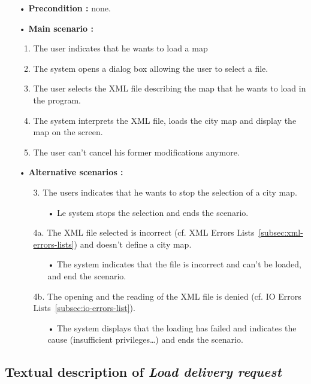 \documentclass[paper=a4, fontsize=11pt]{report}
\numberwithin{equation}{section}		%
\numberwithin{figure}{section}		%
\numberwithin{table}{section}		%
\renewcommand{\it}[1]{\textit{#1}}
\begin{document}
\begin{itemize}
  \item[•] \textbf{Precondition :} none.
  \item[•] \textbf{Main scenario :}
  \begin{enumerate}
    \item The user indicates that he wants to load a map
    \item The system opens a dialog box allowing the user to select a file.
    \item The user selects the XML file describing the map that he wants to load in the program.
    \item The system interprets the XML file, loads the city map and display the map on the screen.
    \item The user can’t cancel his former modifications anymore.
  \end{enumerate}
  \item[•] \textbf{Alternative scenarios :}
  \begin{itemize}
    \item[3.] The users indicates that he wants to stop the selection of a city map.
    \begin{itemize}
      \item[•] Le system stops the selection and ends the scenario.
    \end{itemize}
    \item[4a.] The XML file selected is incorrect (cf. XML Errors Lists~\ref{subsec:xml-errors-lists}) and doesn’t define a city map.
    \begin{itemize}
      \item[•] The system indicates that the file is incorrect and can’t be loaded, and end the scenario.
    \end{itemize}
    \item[4b.] The opening and the reading of the XML file is denied (cf. IO Errors Lists~\ref{subsec:io-errors-list}).
    \begin{itemize}
      \item[•] The system displays that the loading has failed and indicates the cause (insufficient privileges…) and ends the scenario.
    \end{itemize}
  \end{itemize}
\end{itemize}

\subsection{Textual description of \it{Load delivery request}}
\label{subsec:textual-description-of-load-delivery-request}
\end{document}
